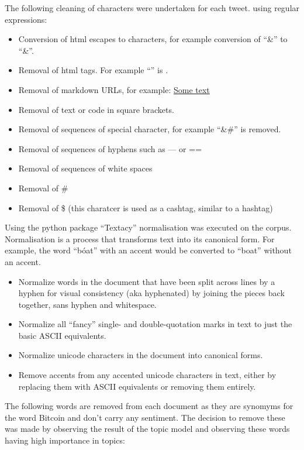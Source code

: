 \documentclass[
]{article}
\providecommand{\tightlist}{%
  \setlength{\itemsep}{0pt}\setlength{\parskip}{0pt}}
\begin{document}
The following cleaning of characters were undertaken for each tweet.
using regular expressions:

\begin{itemize}
\tightlist
\item
  Conversion of html escapes to characters, for example conversion of
  ``\&'' to ``\&''.
\item
  Removal of html tags. For example ``'' is .
\item
  Removal of markdown URLs, for example: \href{https://....}{Some text}
\item
  Removal of text or code in square brackets.
\item
  Removal of sequences of special character, for example ``\&\#'' is
  removed.
\item
  Removal of sequences of hyphens such as --- or ==
\item
  Removal of sequences of white spaces
\item
  Removal of \#
\item
  Removal of \$ (this charatcer is used as a cashtag, similar to a
  hashtag)
\end{itemize}

Using the python package ``Textacy'' normalisation was executed on the
corpus. Normalisation is a process that transforms text into its
canonical form. For example, the word ``bóat'' with an accent would be
converted to ``boat'' without an accent.

\begin{itemize}
\tightlist
\item
  Normalize words in the document that have been split across lines by a
  hyphen for visual consistency (aka hyphenated) by joining the pieces
  back together, sans hyphen and whitespace.
\item
  Normalize all ``fancy'' single- and double-quotation marks in text to
  just the basic ASCII equivalents.
\item
  Normalize unicode characters in the document into canonical forms.
\item
  Remove accents from any accented unicode characters in text, either by
  replacing them with ASCII equivalents or removing them entirely.
\end{itemize}

The following words are removed from each document as they are synomyms
for the word Bitcoin and don't carry any sentiment. The decision to
remove these was made by observing the result of the topic model and
observing these words having high importance in topics:
\end{document}
